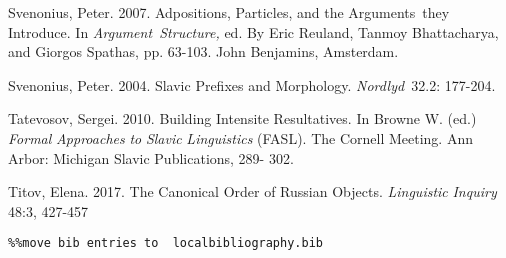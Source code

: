 \documentclass[output=paper,modfonts, nonflat]{langsci/langscibook}
\begin{document}
Svenonius, Peter. 2007. Adpositions, Particles, and the Arguments~they Introduce. In \textit{Argument~Structure,} ed. By Eric Reuland, Tanmoy Bhattacharya, and Giorgos Spathas, pp. 63-103. John Benjamins, Amsterdam.

Svenonius, Peter. 2004. Slavic Prefixes and Morphology. \textit{Nordlyd~}32.2: 177-204.

Tatevosov, Sergei. 2010. Building Intensite Resultatives. In Browne W. (ed.) \textit{Formal} \textit{Approaches} \textit{to} \textit{Slavic} \textit{Linguistics} (FASL). The Cornell Meeting. Ann Arbor: Michigan Slavic Publications, 289- 302.

Titov, Elena. 2017. The Canonical Order of Russian Objects. \textit{Linguistic} \textit{Inquiry} 48:3, 427-457


\begin{verbatim}%%move bib entries to  localbibliography.bib
\end{verbatim}
\sloppy\printbibliography[heading=subbibliography,notkeyword=this]
\end{document}
